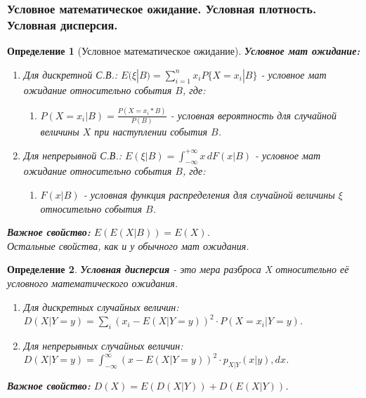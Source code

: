 \documentclass[14pt]{extarticle}
\theoremstyle{breakstyle}
\newtheorem{definition}{Определение}[subsection]
\begin{document}
\subsubsection{Условное математическое ожидание. Условная плотность. Условная дисперсия.}

\begin{definition}[Условное математическое ожидание]

\textbf{Условное мат ожидание:}
\begin{enumerate}
    \item Для дискретной С.В.: $E(\xi | B) = \sum_{i=1}^{n} x_{i} P\{X=x_{i} | B\}$ - условное мат ожидание относительно события $B$, где:
          \begin{enumerate}
              \item $P(X=x_{i} | B) = \frac{P(X=x_{i} * B)}{P(B)}$ - условная вероятность для случайной величины $X$ при наступлении события $B$.
          \end{enumerate}
    \item Для непрерывной С.В.: $E(\xi | B) = \int_{-\infty}^{+\infty} x \, dF(x | B)$ - условное мат ожидание относительно события $B$, где:
          \begin{enumerate}
              \item $F(x | B)$ - условная функция распределения для случайной величины $\xi$ относительно события $B$.
          \end{enumerate}
\end{enumerate}

\vspace{\baselineskip}

\textbf{Важное свойство:} $E(E(X | B)) = E(X)$.\\
Остальные свойства, как и у обычного мат ожидания.

\end{definition}

\begin{definition}

\textbf{Условная дисперсия} - это мера разброса X относительно её условного математического ожидания.
\begin{enumerate}
    \item Для дискретных случайных величин: $D(X|Y=y) = \sum_i (x_i - E(X|Y=y))^2 \cdot P(X=x_i|Y=y)$.
    \item Для непрерывных случайных величин: $D(X|Y=y) = \int_{-\infty}^{\infty} (x - E(X|Y=y))^2 \cdot p_{X|Y}(x|y) , dx$.
\end{enumerate}

\vspace{\baselineskip}

\textbf{Важное свойство:} $D(X) = E(D(X|Y)) + D(E(X|Y))$.

\end{definition}
\end{document}
